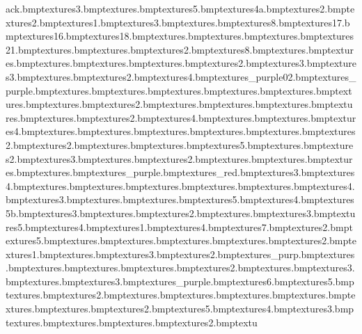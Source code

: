 ack.bmp textures\safeside3.bmp textures\safsamface.bmp textures\piano5.bmp textures\piano4a.bmp textures\piano2.bmp textures\strings2.bmp textures\strings1.bmp textures\piano3.bmp textures\piano.bmp textures\painting8.bmp textures\painting17.bmp textures\painting16.bmp textures\painting18.bmp textures\liftswitch.bmp textures\paintsamwarp.bmp textures\paintporkwarp.bmp textures\painting21.bmp textures\doorgroove.bmp textures\lightstrip.bmp textures\wall2.bmp textures\wall8.bmp textures\light.bmp textures\floortiles.bmp textures\ceilingtiles.bmp textures\steelsteps.bmp textures\floorsteel.bmp textures\floorsteel2.bmp textures\floorsteel3.bmp textures\companel3.bmp textures\companel.bmp textures\companel2.bmp textures\floorsteel4.bmp textures\marbtiles_purple02.bmp textures\marbwalltiles_purple.bmp textures\lockroomwall.bmp textures\lobbydesk.bmp textures\modwall.bmp textures\roofpanels.bmp textures\wall.bmp textures\paintmanw.bmp textures\paintmany.bmp textures\paintman2.bmp textures\marbwall.bmp textures\lightbluewall.bmp textures\marbtiles.bmp textures\industmarb.bmp textures\industwalls.bmp textures\industfloor2.bmp textures\painting4.bmp textures\modwallmarb.bmp textures\bluewall.bmp textures\road4.bmp textures\yellowwall.bmp textures\doorarch.bmp textures\stairs.bmp textures\doorarchbot.bmp textures\doorarchpillar.bmp textures\pillardoor2.bmp textures\marbwall2.bmp textures\yellowarch.bmp textures\roofpanelscorn.bmp textures\libarywall5.bmp textures\ancientcarpet.bmp textures\ancientfloor2.bmp textures\modfloor3.bmp textures\modcarpet.bmp textures\marbtiles2.bmp textures\lobbycarpet.bmp textures\lobbycarpetcol.bmp textures\lobbycarpetcorn.bmp textures\uplights.bmp textures\marbtiles_purple.bmp textures\modfloor_red.bmp textures\carpetblue3.bmp textures\carpetblue4.bmp textures\mat.bmp textures\ancientfloor.bmp textures\warning.bmp textures\pboard.bmp textures\greenwall.bmp textures\tornwallpaper4.bmp textures\tornwallpaper3.bmp textures\fineartmarb.bmp textures\libarywall.bmp textures\haringfloor5.bmp textures\haringfloor4.bmp textures\libarywall5b.bmp textures\libarywall3.bmp textures\whitetile.bmp textures\carpetred2.bmp textures\woodfloor.bmp textures\carpetredworn3.bmp textures\marbtiles5.bmp textures\marbtiles4.bmp textures\carpetred1.bmp textures\bridgesnow4.bmp textures\tornwallpaper7.bmp textures\bluewall2.bmp textures\tornwallpaper5.bmp textures\woodpanelswall.bmp textures\floorboards.bmp textures\ancientmarbwall.bmp textures\ancientwalls.bmp textures\sandbox2.bmp textures\sandbox1.bmp textures\lobbywallpinkstop.bmp textures\panels3.bmp textures\panels2.bmp textures_purp.bmp textures\lockroomdart.bmp textures\marbwallbord.bmp textures\door.bmp textures\marbwallpill.bmp textures\lightbluewall2.bmp textures\road.bmp textures\road3.bmp textures\paintmanr.bmp textures\toilet3.bmp textures_purple.bmp textures\toilet6.bmp textures\toilet5.bmp textures\blacktile.bmp textures\ceilingtiles2.bmp textures\shoesblue.bmp textures\jeans.bmp textures\shoesred.bmp textures\toiletdoor.bmp textures\greengoldtiles.bmp textures\greencarpet.bmp textures\newmoneywall2.bmp textures\newmoneywall5.bmp textures\newmoneywall4.bmp textures\newmoneywall3.bmp textures\newmoneywall.bmp textures\carpetredworn.bmp textures\tornwallpaper.bmp textures\tornwallpaper2.bmp textu
